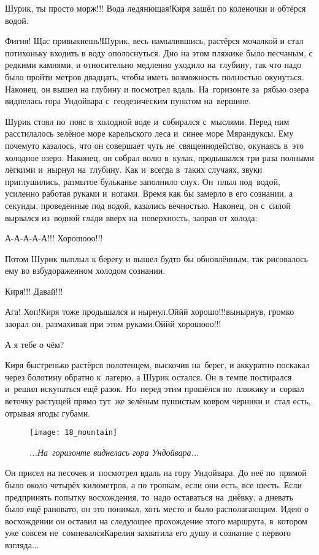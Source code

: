 \diagdash Шурик, ты просто морж!!! Вода ледянющая!\mdash Киря зашёл по коленочки и обтёрся водой.

\diagdash Фигня! Щас привыкнешь!\mdash Шурик, весь намылившись, растёрся мочалкой и стал потихоньку входить в воду ополоснуться. Дно на этом пляжике было песчаным, с редкими камнями, и относительно медленно уходило на~глубину, так что надо было пройти метров двадцать, чтобы иметь возможность полностью окунуться. Наконец, он вышел на глубину и посмотрел вдаль. На~горизонте за~рябью озера виднелась гора Ундойвара с~геодезическим пунктом на~вершине.  

Шурик стоял по~пояс в~холодной воде и~собирался с~мыслями. Перед ним расстилалось зелёное море карельского леса и~синее море Мярандуксы. Ему почему\sdash то казалось, что он совершает чуть не~священнодейство, окунаясь в~это холодное озеро. Наконец, он собрал волю в~кулак, продышался три раза полными лёгкими и~нырнул на~глубину. Как и~всегда в~таких случаях, звуки приглушились, размытое бульканье заполнило слух. Он~плыл под~водой, усиленно работая руками и~ногами. Время как бы замерло в его сознании, а секунды, проведённые под водой, казались вечностью. Наконец, он с~силой вырвался из~водной глади вверх на~поверхность, заорав от холода:

\diagdash А-А-А-А-А!!! Хорошо\sdash о\sdash о!!!
\nopagebreak

Потом Шурик выплыл к берегу и вышел будто бы обновлённым, так рисовалось ему во взбудораженном холодом сознании.

\diagdash Киря!!! Давай!!! 

\diagdash Ага! Хоп!\mdash Киря тоже продышался и нырнул.\mdash Ой\sdash й\sdash й хорошо!!!\mdash вынырнув, громко заорал он, размахивая при этом руками.\mdash Ой\sdash й\sdash й хорошо\sdash о\sdash о!!!

\diagdash А я тебе о чём?

Киря быстренько растёрся полотенцем, выскочив на~берег, и аккуратно поскакал через болотину обратно к~лагерю, а Шурик остался. Он в темпе постирался и~решил искупаться ещё разок. Но~перед этим прошёлся по~пляжику и~сорвал веточку растущей прямо тут~же зелёным пушистым ковром черники и~стал есть, отрывая ягоды губами. 

{
\setlength{\belowcaptionskip}{-5mm}
\begin{figure}[h]
\centering
\texttt{[image: 18\_mountain]}
\caption{\small\textit{...На~горизонте виднелась гора Ундойвара...}}
\end{figure}

Он присел на песочек и~посмотрел вдаль на гору Ундойвара. До неё по~прямой было около четырёх километров, а по тропкам, если они есть, все шесть. Если предпринять попытку восхождения, то~надо оставаться на~днёвку, а дневать было ещё рановато, он это понимал, хоть место и было располагающим. Идею о восхождении он оставил на следующее прохождение этого маршрута, в~котором уже совсем не~сомневался\mdash Карелия захватила его душу и сознание с первого взгляда$\ldots$ 
}

